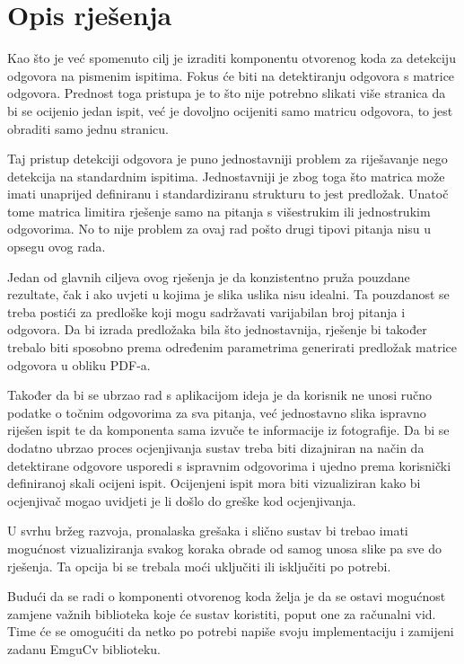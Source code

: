 \documentclass{foi}
\begin{document}
\section{Opis rješenja}

Kao što je već spomenuto cilj je izraditi komponentu otvorenog koda za detekciju odgovora na pismenim ispitima. Fokus će biti na detektiranju odgovora s matrice odgovora. Prednost toga pristupa je to što nije potrebno slikati više stranica da bi se ocijenio jedan ispit, već je dovoljno ocijeniti samo matricu odgovora, to jest obraditi samo jednu stranicu. 

Taj pristup detekciji odgovora je puno jednostavniji problem za riješavanje nego detekcija na standardnim ispitima. Jednostavniji je zbog toga što matrica može imati unaprijed definiranu i standardiziranu strukturu to jest predložak. Unatoč tome matrica limitira rješenje samo na pitanja s višestrukim ili jednostrukim odgovorima. No to nije problem za ovaj rad pošto drugi tipovi pitanja nisu u opsegu ovog rada.

Jedan od glavnih ciljeva ovog rješenja je da konzistentno pruža pouzdane rezultate, čak i ako uvjeti u kojima je slika uslika nisu idealni. Ta pouzdanost se treba postići za predloške koji mogu sadržavati varijabilan broj pitanja i odgovora. Da bi izrada predložaka bila što jednostavnija, rješenje bi također trebalo biti sposobno prema određenim parametrima generirati predložak matrice odgovora u obliku PDF-a. 

Također da bi se ubrzao rad s aplikacijom ideja je da korisnik ne unosi ručno podatke o točnim odgovorima za sva pitanja, već jednostavno slika ispravno riješen ispit te da komponenta sama izvuče te informacije iz fotografije. Da bi se dodatno ubrzao proces ocjenjivanja sustav treba biti dizajniran na način da detektirane odgovore usporedi s ispravnim odgovorima i ujedno prema korisnički definiranoj skali ocijeni ispit. Ocijenjeni ispit mora biti vizualiziran kako bi ocjenjivač mogao uvidjeti je li došlo do greške kod ocjenjivanja.

U svrhu bržeg razvoja, pronalaska grešaka i slično sustav bi trebao imati mogućnost vizualiziranja svakog koraka obrade od samog unosa slike pa sve do rješenja. Ta opcija bi se trebala moći uključiti ili isključiti po potrebi. 

Budući da se radi o komponenti otvorenog koda želja je da se ostavi mogućnost zamjene važnih biblioteka koje će sustav koristiti, poput one za računalni vid. Time će se omogućiti da netko po potrebi napiše svoju implementaciju i zamijeni zadanu EmguCv biblioteku.
\end{document}

